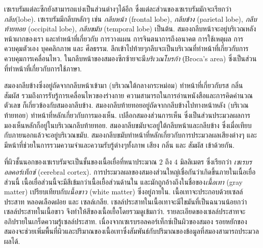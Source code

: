 {\begin{shaded}
เซเรบรัมแต่ละซีกยังสามารถแบ่งเป็นส่วนต่างๆได้อีก ซึ่งแต่ละส่วนของเซเรบรัมมักจะเรียกว่า\textit{กลีบ}(lobe).
เซเรบรัมมีกลีบหลักๆ เช่น \textit{กลีบหน้า} (frontal lobe), \textit{กลีบข้าง} (parietal lobe), \textit{กลีบท้ายทอย} (occipital lobe), \textit{กลีบขมับ} (temporal lobe) เป็นต้น.
สมองกลีบหน้าจะอยู่บริเวณหลังหน้าผากของเรา 
และทำหน้าที่เกี่ยวกับ การวางแผน การจินตนาการถึงอนาคต การใช้เหตุผล
การควบคุมตัวเอง บุคคลิกภาพ และ ศีลธรรม.
ลึกเข้าไปท้ายๆกลีบจะเป็นบริเวณที่ทำหน้าที่เกี่ยวกับการควบคุมการเคลื่อนไหว.
ในกลีบหน้าของสมองซีกซ้ายจะมี\textit{บริเวณโบรก้า} (ฺBroca's area) ซึ่งเป็นส่วนที่ทำหน้าที่เกี่ยวกับการใช้ภาษา.

สมองกลีบข้างซึ่งอยู่ถัดจากกลีบหน้าเข้ามา (บริเวณใต้กลางกระหม่อม) ทำหน้าที่เกี่ยวกับรส กลิ่น สัมผัส รวมถึงการรับรู้การเคลื่อนไหวของร่างกาย
ความสามารถในการอ่านหนังสือและการคิดคำนวณตัวเลข ก็เกี่ยวข้องกับสมองกลีบข้าง.
%
สมองกลีบท้ายทอยอยู่ถัดจากกลีบข้างไปทางหน้าหลัง (บริเวณท้ายทอย) ทำหน้าที่หลักเกี่ยวกับการมองเห็น.
เปลือกสมองส่วนการเห็น ซึ่งเป็นส่วนประมวลผลการมองเห็นหลักก็อยู่ในบริเวณกลีบท้ายทอย.
%
สมองกลีบขมับจะอยู่ใต้กลีบหน้าและกลีบข้าง ซึ่งเมื่อเทียบกับภายนอกแล้วจะอยู่บริเวณขมับ.
สมองกลีบขมับทำหน้าที่หลักเกี่ยวกับการประมวลผลเสียงต่างๆ และมีหน้าที่ช่วยในการรวมความจำและความรับรู้ต่างๆทั้งภาพ เสียง กลิ่น และ สัมผัส เข้าด้วยกัน.

ที่ผิวชั้นนอกของเซเรบรัมจะเป็นชั้นของเนื้อเยื่อที่หนาประมาณ $2$ ถึง $4$ มิลลิเมตร ซึ่งเรียกว่า \textit{เซเรบรอลคอร์เท็กซ์} (cerebral cortex).
การประมวลผลของสมองส่วนใหญ่เชื่อกันว่าเกิดขึ้นภายในเนื้อเยื่อส่วนนี้
เนื้อเยื่อส่วนนี้จะมีสีเข้มกว่าเนื้อเยื้อส่วนด้านใน 
และมักถูกอ้างถึงในชื่อของ\textit{เนื้อเทา} (gray matter)
เปรียบเทียบกับ\textit{เนื้อขาว} (white matter) ซึ่งอยู่ภายใน.
เนื้อเทาจะประกอบด้วยเซลล์ประสาท หลอดเลือดฝอย และ เซลล์เกลีย.
เซลล์ประสาทในเนื้อเทาจะมีไขมันที่เป็นฉนวนน้อยกว่าเซลล์ประสาทในเนื้อขาว
จึงทำให้สีของเนื้อเยื้อโดยรวมดูเข้มกว่า.
รายละเอียดของเซลล์ประสาทจะอภิปรายในเกร็ดความรู้เซลล์ประสาท.
เนื่องจากเซเรบรอลคอร์เท็กซ์เป็นผิวของสมอง รอยหยักของสมองจะช่วยเพิ่มพื้นที่ผิวและปริมาณของเนื้อเทาซึ่งสัมพันธ์กับปริมาณของข้อมูลที่สมองสามารถประมวลผลได้.


\end{shaded}}
